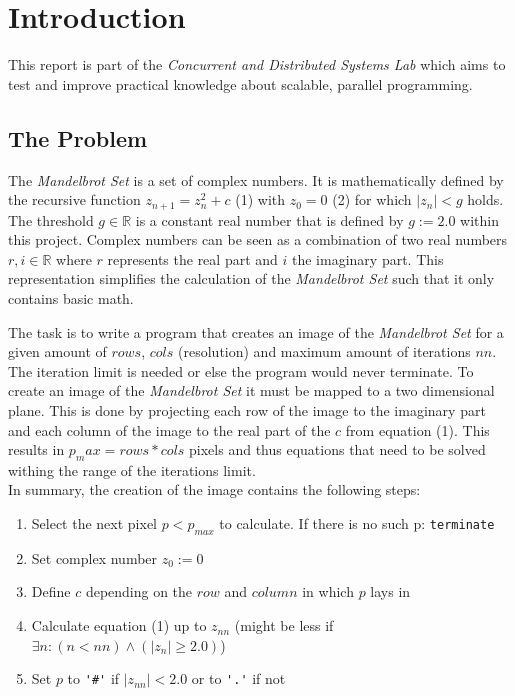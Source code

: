 \newcommand{\reporttitle}{Mandelbrot Set}
\newcommand{\ms}{\textit{Mandelbrot Set}}




\setspacings
\maketitle

\clearpage
\setcounter{page}{1}

\section{Introduction}
\label{sec:introduction}

This report is part of the \textit{Concurrent and Distributed Systems Lab} which aims to test and improve practical knowledge about scalable, parallel programming.

\subsection{The Problem}
\label{ssec:problem}

The \ms{} is a set of complex numbers. It is mathematically defined by the recursive function $z_{n+1} = z_n^2 + c$ (1) with $z_0 = 0$ (2) for which $|z_n| < g$ holds. The threshold $g \in \mathbb{R}$ is a constant real number that is defined by $ g:= 2.0$ within this project. Complex numbers can be seen as a combination of two real numbers $r, i \in \mathbb{R}$ where $r$ represents the real part and $i$ the imaginary part. This representation simplifies the calculation of the \ms{} such that it only contains basic math.

The task is to write a program that creates an image of the \ms{} for a given amount of $rows$, $cols$ (resolution) and maximum amount of iterations $nn$. The iteration limit is needed or else the program would never terminate. To create an image of the \ms{} it must be mapped to a two dimensional plane. This is done by projecting each row of the image to the imaginary part and each column of the image to the real part of the $c$ from equation (1). This results in $p_max = rows*cols$ pixels and thus equations that need to be solved withing the range of the iterations limit.\\

\noindent In summary, the creation of the image contains the following steps:
\begin{enumerate}
    \item Select the next pixel $p < p_{max}$ to calculate. If there is no such p: \verb$terminate$
    \item Set complex number $z_0 := 0$
    \item Define $c$ depending on the $row$ and $column$ in which $p$ lays in
    \item Calculate equation (1) up to $z_{nn}$ (might be less if $\exists n: (n < nn) \land (|z_n| \ge 2.0)$)
    \item Set $p$ to \verb|'#'| if $|z_{nn}| < 2.0$ or to \verb|'.'| if not
\end{enumerate}


